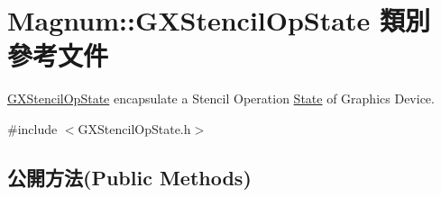 \hypertarget{class_magnum_1_1_g_x_stencil_op_state}{}\section{Magnum\+:\+:G\+X\+Stencil\+Op\+State 類別 參考文件}
\label{class_magnum_1_1_g_x_stencil_op_state}


\hyperlink{class_magnum_1_1_g_x_stencil_op_state}{G\+X\+Stencil\+Op\+State} encapsulate a Stencil Operation \hyperlink{class_magnum_1_1_state}{State} of Graphics Device.  




{\ttfamily \#include $<$G\+X\+Stencil\+Op\+State.\+h$>$}

\subsection*{公開方法(Public Methods)}

